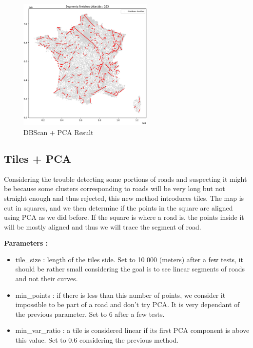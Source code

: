 \documentclass[main.tex]{subfiles}
\begin{document}
\begin{figure}[H]
    \centering
    \includegraphics[width=0.6\textwidth]{Images/Res_DBSCAN+PCA.png}
    \caption{DBScan + PCA Result}
\end{figure}

\subsection{Tiles + PCA}

Considering the trouble detecting some portions of roads and suspecting it might be because some clusters corresponding to roads will be very long but not straight enough and thus rejected, this new method introduces tiles. The map is cut in squares, and we then determine if the points in the square are aligned using PCA as we did before. If the square is where a road is, the points inside it will be mostly aligned and thus we will trace the segment of road.

\textbf{Parameters : }
\begin{itemize}
    \item tile\_size : length of the tiles side. Set to 10 000 (meters) after a few tests, it should be rather small considering the goal is to see linear segments of roads and not their curves.
    \item min\_points : if there is less than this number of points, we consider it impossible to be part of a road and don't try PCA. It is very dependant of the previous parameter. Set to 6 after a few tests.
    \item min\_var\_ratio : a tile is considered linear if its first PCA component is above this value. Set to 0.6 considering the previous method.
\end{itemize}
\end{document}
